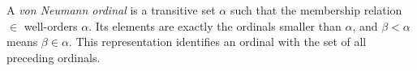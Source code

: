 
A \emph{von Neumann ordinal} is a transitive set $\alpha$ such that the membership relation $\in$ well-orders $\alpha$. Its elements are exactly the ordinals smaller than $\alpha$, and $\beta<\alpha$ means $\beta\in\alpha$. This representation identifies an ordinal with the set of all preceding ordinals.
